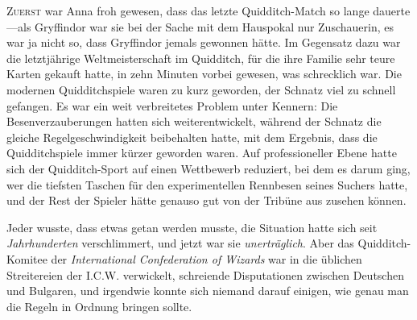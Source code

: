 
\lettrine{Z}{uerst} war Anna froh gewesen, dass das letzte Quidditch-Match so lange dauerte—als Gryffindor war sie bei der Sache mit dem Hauspokal nur Zuschauerin, es war ja nicht so, dass Gryffindor jemals gewonnen hätte. Im Gegensatz dazu war die letztjährige Weltmeisterschaft im Quidditch, für die ihre Familie sehr teure Karten gekauft hatte, in zehn Minuten vorbei gewesen, was schrecklich war. Die modernen Quidditchspiele waren zu kurz geworden, der Schnatz viel zu schnell gefangen. Es war ein weit verbreitetes Problem unter Kennern: Die Besenverzauberungen hatten sich weiterentwickelt, während der Schnatz die gleiche Regelgeschwindigkeit beibehalten hatte, mit dem Ergebnis, dass die Quidditchspiele immer kürzer geworden waren.
Auf professioneller Ebene hatte sich der Quidditch-Sport auf einen Wettbewerb reduziert, bei dem es darum ging, wer die tiefsten Taschen für den experimentellen Rennbesen seines Suchers hatte, und der Rest der Spieler hätte genauso gut von der Tribüne aus zusehen können.

Jeder wusste, dass etwas getan werden musste, die Situation hatte sich seit \emph{Jahrhunderten} verschlimmert, und jetzt war sie \emph{unerträglich}. Aber das Quidditch-Komitee der \emph{International Confederation of Wizards} war in die üblichen Streitereien der I.C.W. verwickelt, schreiende Disputationen zwischen Deutschen und Bulgaren, und irgendwie konnte sich niemand darauf einigen, wie genau man die Regeln in Ordnung bringen sollte.

